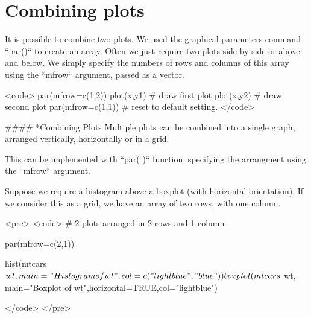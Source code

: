 

\section*{Combining plots}
It is possible to combine two plots. We used the graphical parameters command ``par()`` to create an array. 
Often we just require two plots side by side or above and below. 
We simply specify the numbers of rows and columns of this array using the ``mfrow`` argument, passed as a vector.

<code>
par(mfrow=c(1,2))
plot(x,y1)			# draw first plot
plot(x,y2)			# draw second plot
par(mfrow=c(1,1))		# reset to default setting.
</code>

#### *{Combining Plots}
Multiple plots can be combined into a single graph, arranged vertically, horizontally or in a grid.

This can be implemented with ``par( )`` function, specifying the arrangment using the ``mfrow`` argument.

Suppose we require a histogram above a boxplot (with horizontal orientation). 
If we consider this as a grid, we have an array of two rows, with one column.

<pre>
<code>
# 2 plots arranged in 2 rows and 1 column


par(mfrow=c(2,1))


hist(mtcars$wt, main="Histogram of wt",col=c("lightblue","blue"))
boxplot(mtcars$
wt, main="Boxplot of wt",horizontal=TRUE,col="lightblue")

</code>
</pre>

